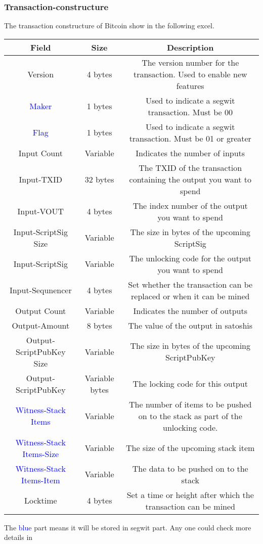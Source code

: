 \subsubsection{Transaction-constructure}

The transaction constructure of Bitcoin show in the following excel.

\begin{tabular}{|c|c|c|} \hline
    Field & Size & Description \\ \hline
    Version & 4 bytes & The version number for the transaction. Used to enable new features  \\ \hline
    \textcolor{blue}{Maker} & 1 bytes & Used to indicate a segwit transaction. Must be 00 \\ \hline
    \textcolor{blue}{Flag} & 1 bytes & Used to indicate a segwit transaction. Must be 01 or greater  \\ \hline
    Input Count & Variable & Indicates the number of inputs  \\ \hline
    Input-TXID & 32 bytes & The TXID of the transaction containing the output you want to spend  \\ \hline
    Input-VOUT & 4 bytes & The index number of the output you want to spend  \\ \hline
    Input-ScriptSig Size & Variable & The size in bytes of the upcoming ScriptSig  \\ \hline
    Input-ScriptSig & Variable & The unlocking code for the output you want to spend  \\ \hline
    Input-Sequnencer & 4 bytes & Set whether the transaction can be replaced or when it can be mined  \\ \hline
    Output Count & Variable & Indicates the number of outputs  \\ \hline
    Output-Amount & 8 bytes & The value of the output in satoshis  \\ \hline
    Output-ScriptPubKey Size & Variable & The size in bytes of the upcoming ScriptPubKey  \\ \hline
    Output-ScriptPubKey & Variable bytes & The locking code for this output  \\ \hline
    \textcolor{blue}{Witness-Stack Items} & Variable & The number of items to be pushed on to the stack as part of the unlocking code.  \\ \hline
    \textcolor{blue}{Witness-Stack Items-Size} & Variable & The size of the upcoming stack item  \\ \hline
    \textcolor{blue}{Witness-Stack Items-Item} & Variable & The data to be pushed on to the stack  \\ \hline
    Locktime & 4 bytes & Set a time or height after which the transaction can be mined  \\ \hline
\end{tabular}

The \textcolor{blue}{blue} part means it will be stored in segwit part. Any one could check more details in \cite{website:transaction-constructure}
